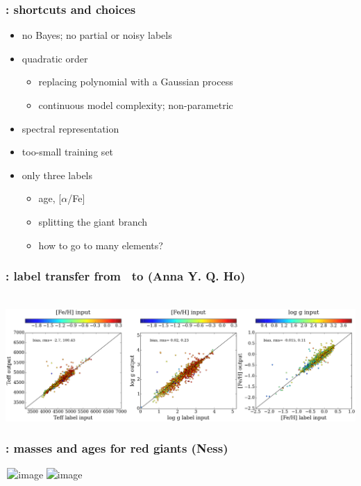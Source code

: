 \documentclass[pdftex]{beamer}
\begin{document}
\results

\begin{frame}
  \frametitle{\tc: shortcuts and choices}
  \begin{itemize}
  \item no Bayes; no partial or noisy labels
  \item quadratic order
    \begin{itemize}
    \item replacing polynomial with a Gaussian process
    \item continuous model complexity; non-parametric
    \end{itemize}
  \item spectral representation
  \item too-small training set
  \item only three labels
    \begin{itemize}
    \item age, [$\alpha$/Fe]
    \item splitting the giant branch
    \item how to go to many elements?
    \end{itemize}
  \end{itemize}
\end{frame}

\begin{frame}
  \frametitle{\tc: label transfer from \apogee\ to  (Anna Y. Q. Ho)}
  \,\hfill\includegraphics[width=\figurewidth]{LAMOST.png}
\end{frame}

\begin{frame}
  \frametitle{\tc: masses and ages for red giants (Ness)}
  \,\hfill\includegraphics<1>[width=\figurewidth]{6labels_mass.png}%
          \includegraphics<2>[width=\figurewidth]{6labels_age.png}
\end{frame}
\end{document}
